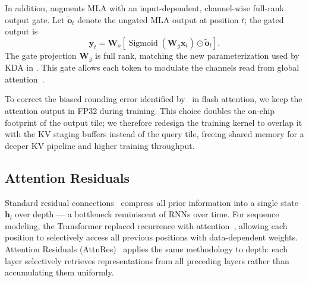 In addition,  augments MLA with an input-dependent, channel-wise full-rank output gate.
Let $\tilde{\bm{o}}_t$ denote the ungated MLA output at position $t$; the gated output is
\begin{equation}
    \bm{y}_t
    = \mathbf{W}_o\!\left[
        \operatorname{Sigmoid}\!\left(\mathbf{W}_g\bm{x}_t\right)
        \odot \tilde{\bm{o}}_t
        \right].
    \label{eq:gated-mla-output}
\end{equation}
The gate projection $\mathbf{W}_g$ is full rank, matching the new parameterization used by KDA in . This gate allows each token to modulate the channels read from global attention~\citep{qiu2025gated}.

To correct the biased rounding error identified by~\citep{qiu2025lowprecision} in flash attention, we keep the attention output in FP32 during training.
This choice doubles the on-chip footprint of the output tile; we therefore redesign the training kernel to overlap it with the KV staging buffers instead of the query tile, freeing shared memory for a deeper KV pipeline and higher training throughput.

\subsection{Attention Residuals}
\label{sec:attnres}

Standard residual connections~\citep{he2015resnet} compress all prior information into a single state $\bm{h}_l$ over depth --- a bottleneck reminiscent of RNNs over time. For sequence modeling, the Transformer replaced recurrence with attention~\citep{bahdanau2014attention,vaswani-2017-attention}, allowing each position to selectively access all previous positions with data-dependent weights. Attention Residuals (AttnRes)~\citep{kimiteam2026attnres} applies the same methodology to depth: each layer selectively retrieves representations from all preceding layers rather than accumulating them uniformly.

